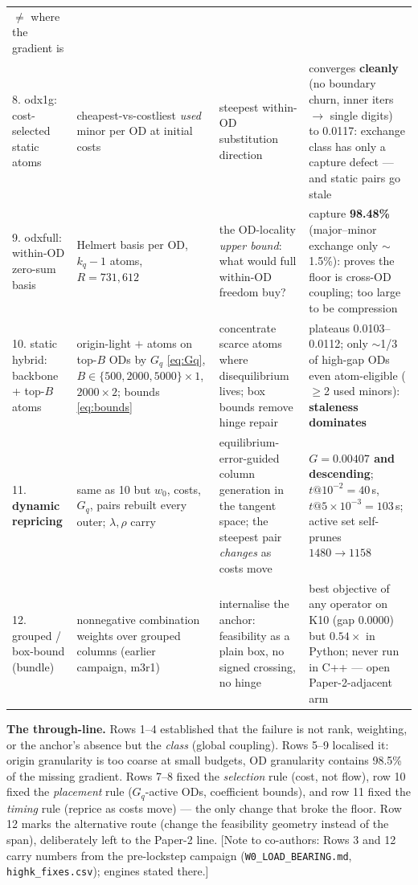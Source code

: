 \documentclass[11pt]{article}
\newif\ifshownotes \shownotestrue
\newcommand{\conote}[1]{\ifshownotes{\color{red}\small\textsf{[Note to co-authors: #1]}}\fi}
\begin{document}
\begin{table}[h]
\begin{tabular}{p{2.9cm}p{4.3cm}p{4.6cm}p{3.0cm}}
$\ne$ where the gradient is\\[2pt]
8. odx1g: cost-selected static atoms &
cheapest-vs-costliest \emph{used} minor per OD at initial costs &
steepest within-OD substitution direction &
converges \textbf{cleanly} (no boundary churn, inner iters $\to$ single digits) to
0.0117: exchange class has only a capture defect --- and static pairs go stale\\[2pt]
9. odxfull: within-OD zero-sum basis &
Helmert basis per OD, $k_q{-}1$ atoms, $R{=}731{,}612$ &
the OD-locality \emph{upper bound}: what would full within-OD freedom buy? &
capture \textbf{98.48\%} (major--minor exchange only $\sim$1.5\%): proves the floor is
cross-OD coupling; too large to be compression\\[2pt]
10. static hybrid: backbone + top-$B$ atoms &
origin-light $+$ atoms on top-$B$ ODs by $G_q$ \eqref{eq:Gq},
$B{\in}\{500,2000,5000\}{\times}1$, $2000{\times}2$; bounds \eqref{eq:bounds} &
concentrate scarce atoms where disequilibrium lives; box bounds remove hinge repair &
plateaus 0.0103--0.0112; only $\sim$1/3 of high-gap ODs even atom-eligible
($\ge$2 used minors): \textbf{staleness dominates}\\[2pt]
11. \textbf{dynamic repricing} &
same as 10 but $w_0$, costs, $G_q$, pairs rebuilt every outer; $\lambda,\rho$ carry &
equilibrium-error-guided column generation in the tangent space; the steepest pair
\emph{changes} as costs move &
\textbf{$G=0.00407$ and descending}; $t@10^{-2}{=}40$\,s, $t@5{\times}10^{-3}{=}103$\,s;
active set self-prunes $1480\!\to\!1158$\\[2pt]
12. grouped / box-bound (bundle) &
nonnegative combination weights over grouped columns (earlier campaign, m3r1) &
internalise the anchor: feasibility as a plain box, no signed crossing, no hinge &
best objective of any operator on K10 (gap 0.0000) but $0.54{\times}$ in Python;
never run in C++ --- open Paper-2-adjacent arm\\
\bottomrule
\end{tabular}
\end{table}

\noindent\textbf{The through-line.} Rows 1--4 established that the failure is not rank,
weighting, or the anchor's absence but the \emph{class} (global coupling). Rows 5--9
localised it: origin granularity is too coarse at small budgets, OD granularity contains
98.5\% of the missing gradient. Rows 7--8 fixed the \emph{selection} rule (cost, not
flow), row 10 fixed the \emph{placement} rule ($G_q$-active ODs, coefficient bounds),
and row 11 fixed the \emph{timing} rule (reprice as costs move) --- the only change that
broke the floor. Row 12 marks the alternative route (change the feasibility geometry
instead of the span), deliberately left to the Paper-2 line.
\conote{Rows 3 and 12 carry numbers from the pre-lockstep campaign
(\texttt{W0\_LOAD\_BEARING.md}, \texttt{highk\_fixes.csv}); engines stated there.}
\end{document}
